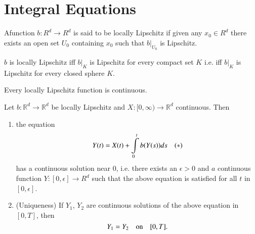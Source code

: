 \chapter{Integral Equations}\label{chap21}

\begin{defi*}
A\pageoriginale function $b:R^{d}\to R^{d}$ is said to be locally
Lipschitz if given any $x_{0}\in R^{d}$ there exists an open set
$U_{0}$ containing $x_{0}$ such that $b|_{U_{0}}$ is Lipschitz.
\end{defi*}

\setcounter{exercise}{0}
\begin{exercise}\label{chap21-exer1}
$b$ is locally Lipschitz iff $b|_{K}$ is Lipschitz for every compact
  set $K$ i.e. iff $b|_{K}$ is Lipschitz for every closed sphere $K$.
\end{exercise}

\begin{exercise}\label{chap21-exer2}
Every locally Lipschitz function is continuous.
\end{exercise}

\begin{theorem*}
Let $b:\mathbb{R}^{d}\to \mathbb{R}^{d}$ be locally Lipschitz and
$X:[0,\infty)\to   \mathbb{R}^{d}$ continuous. Then
\begin{enumerate}
\renewcommand{\theenumi}{\roman{enumi}}
\renewcommand{\labelenumi}{\rm(\theenumi)}
\item the equation
$$
Y(t)=X(t)+\int\limits^{t}_{0}b(Y(s))ds\quad (*)
$$
has a continuous solution near $0$, i.e. there exists an $\epsilon>0$
and $a$ continuous function $Y:[0,\epsilon]\to R^{d}$ such that the
above equation is satisfied for all $t$ in $[0,\epsilon]$.

\item (Uniqueness) If $Y_{1}$, $Y_{2}$ are continuous solutions of the
  above equation in $[0,T]$, then
$$
Y_{1}=Y_{2}\quad\text{on}\quad [0,T].
$$ 
\end{enumerate}
\end{theorem*}

